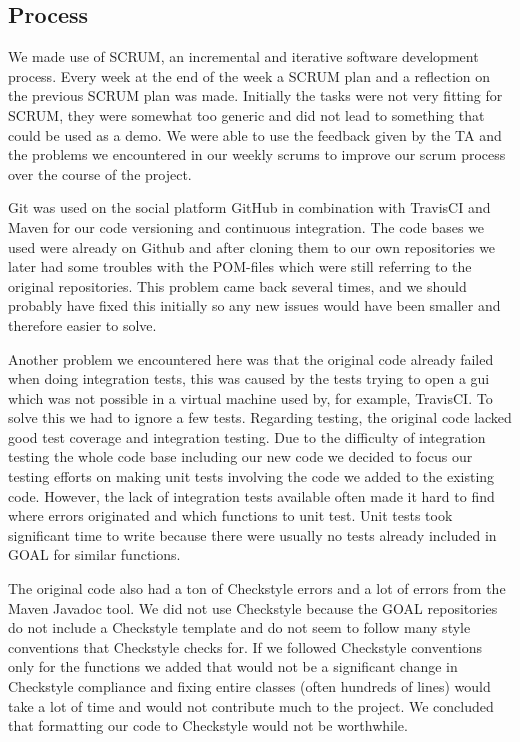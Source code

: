 \documentclass[11pt]{article}
\begin{document}
\subsection{Process}
We made use of \gls{SCRUM}, an incremental and iterative software development process. Every week at the end of the week a SCRUM plan and a reflection on the previous SCRUM plan was made. Initially the tasks were not very fitting for SCRUM, they were somewhat too generic and did not lead to something that could be used as a demo. We were able to use the feedback given by the TA and the problems we encountered in our weekly scrums to improve our scrum process over the course of the project. \par 
Git\cite{git} was used on the social platform GitHub\cite{GitHub} in combination with TravisCI\cite{TravisCI} and Maven\cite{Maven} for our code versioning and continuous integration. The code bases we used were already on Github and after cloning them to our own repositories we later had some troubles with the POM-files which were still referring to the original repositories. This problem came back several times, and we should probably have fixed this initially so any new issues would have been smaller and therefore easier to solve. \par 
Another problem we encountered here was that the original code already failed when doing integration tests, this was caused by the tests trying to open a gui which was not possible in a virtual machine used by, for example, \gls{TravisCI}. To solve this we had to ignore a few tests. Regarding testing, the original code lacked good test coverage and integration testing. Due to the difficulty of integration testing the whole code base including our new code we decided to focus our testing efforts on making unit tests involving the code we added to the existing code. However, the lack of integration tests available often made it hard to find where errors originated and which functions to unit test. Unit tests took significant time to write because there were usually no tests already included in GOAL for similar functions. \par 
The original code also had a ton of Checkstyle errors and a lot of errors from the Maven Javadoc tool. We did not use Checkstyle because the GOAL repositories do not include a Checkstyle template and do not seem to follow many style conventions that Checkstyle checks for. If we followed Checkstyle conventions only for the functions we added that would not be a significant change in Checkstyle compliance and fixing entire classes (often hundreds of lines) would take a lot of time and would not contribute much to the project. We concluded that formatting our code to Checkstyle would not be worthwhile.\\
\end{document}
